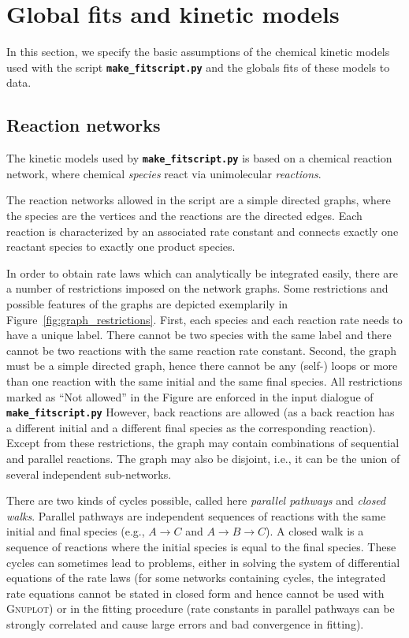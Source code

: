 \documentclass[a4paper,10pt,DIV=15,openany,twoside=false]{scrbook}
\newcommand{\ttt}[1]{\textbf{\texttt{#1}}}
\begin{document}

\section{Global fits and kinetic models}\label{met:globalfit}

In this section, we specify the basic assumptions of the chemical kinetic models used with the script \ttt{make\_fitscript.py} and the globals fits of these models to data.

\subsection{Reaction networks}

The kinetic models used by \ttt{make\_fitscript.py} is based on a chemical reaction network, where chemical \textit{species} react via unimolecular \textit{reactions}.

The reaction networks allowed in the script are a simple directed graphs, where the species are the vertices and the reactions are the directed edges.
Each reaction is characterized by an associated rate constant and connects exactly one reactant species to exactly one product species.

In order to obtain rate laws which can analytically be integrated easily, there are a number of restrictions imposed on the network graphs.
Some restrictions and possible features of the graphs are depicted exemplarily in Figure~\ref{fig:graph_restrictions}.
First, each species and each reaction rate needs to have a unique label. 
There cannot be two species with the same label and there cannot be two reactions with the same reaction rate constant.
Second, the graph must be a simple directed graph, hence there cannot be any (self-) loops or more than one reaction with the same initial and the same final species.
All restrictions marked as ``Not allowed'' in the Figure are enforced in the input dialogue of \ttt{make\_fitscript.py}
However, back reactions are allowed (as a back reaction has a different initial and a different final species as the corresponding reaction).
Except from these restrictions, the graph may contain combinations of sequential and parallel reactions.
The graph may also be disjoint, i.e., it can be the union of several independent sub-networks.

There are two kinds of cycles possible, called here \textit{parallel pathways} and \textit{closed walks}.
Parallel pathways are independent sequences of reactions with the same initial and final species (e.g., $A\rightarrow C$ and $A\rightarrow B\rightarrow C$).
A closed walk is a sequence of reactions where the initial species is equal to the final species.
These cycles can sometimes lead to problems, either in solving the system of differential equations of the rate laws (for some networks containing cycles, the integrated rate equations cannot be stated in closed form and hence cannot be used with \textsc{Gnuplot}) or in the fitting procedure (rate constants in parallel pathways can be strongly correlated and cause large errors and bad convergence in fitting).
\end{document}
